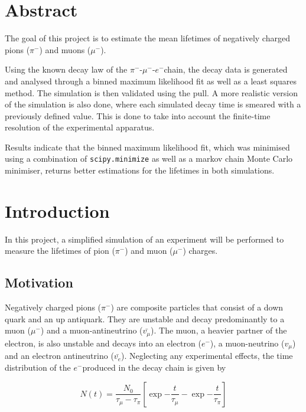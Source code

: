 \documentclass[11pt, a4paper, oneside]{book}
\newcommand{\electron}{$e^{-}$}
\newcommand{\pion}{$\pi^{-}$}
\newcommand{\muon}{$\mu^{-}$}
\begin{document}

\frontmatter

\tableofcontents
\mainmatter

\chapter{Abstract}
The goal of this project is to estimate the mean lifetimes of negatively charged pions (\pion) and muons (\muon). 

Using the known decay law of the \pion-\muon-\electron chain, the decay data is generated and analysed through a binned maximum likelihood fit as well as a least squares method. The simulation is then validated using the pull. A more realistic version of the simulation is also done, where each simulated decay time is smeared with a previously defined value. This is done to take into account the finite-time resolution of the experimental apparatus.

Results indicate that the binned maximum likelihood fit, which was minimised using a combination of \lstinline{scipy.minimize} as well as a markov chain Monte Carlo minimiser, returns better estimations for the lifetimes in both simulations. 


\chapter{Introduction}
In this project, a simplified simulation of an experiment will be performed to measure the lifetimes of pion (\pion) and muon (\muon) charges.

\section{Motivation}
Negatively charged pions (\pion) are composite particles that consist of a down quark and an up antiquark. They are unstable and decay predominantly to a muon (\muon) and a muon-antineutrino ($\bar{v_{\mu}}$). The muon, a heavier partner of the electron, is also unstable and decays into an electron (\electron), a muon-neutrino ($v_{\mu}$) and an electron antineutrino ($\bar{v_{e}}$). Neglecting any experimental effects, the time distribution of the \electron produced in the decay chain is given by

\begin{equation}
    N(t) = \frac{N_0}{\tau_{\mu} - \tau_{\pi}}  \left[ \exp{-\frac{t}{\tau_{\mu}}} - \exp{-\frac{t}{\tau_{\pi}}} \right]
    \label{eq:decay_chain_equation}
\end{equation}
\end{document}
